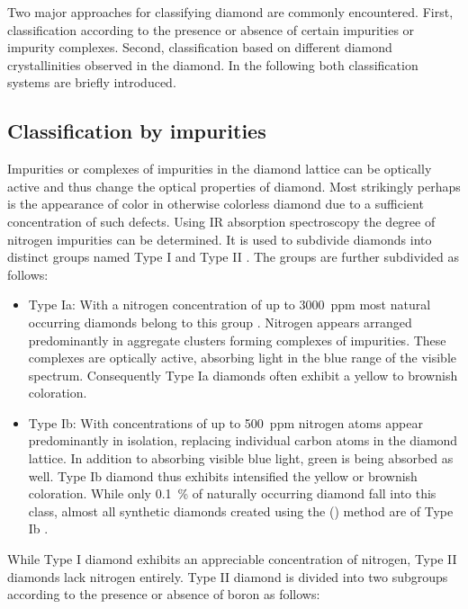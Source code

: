   Two major approaches for classifying diamond are commonly encountered. First, classification according to the presence or absence of certain impurities or impurity complexes. Second, classification based on different diamond crystallinities observed in the diamond. In the following both classification systems are briefly introduced.

  \subsection{Classification by impurities}

    Impurities or complexes of impurities in the diamond lattice can be optically active and thus change the optical properties of diamond. Most strikingly perhaps is the appearance of color in otherwise colorless diamond due to a sufficient concentration of such defects. Using IR absorption spectroscopy the degree of nitrogen impurities can be determined. It is used to subdivide diamonds into distinct groups named Type I and Type II \cite{Kaiser1959, Breeding2009}. The groups are further subdivided as follows:

    \begin{itemize}
          \item Type Ia: With a nitrogen concentration of up to \SI{3000}{ppm} most natural occurring diamonds belong to this group \cite{Zaitsev2001}. Nitrogen appears arranged predominantly in aggregate clusters forming complexes of impurities. These complexes are optically active, absorbing light in the blue range of the visible spectrum. Consequently Type Ia diamonds often exhibit a yellow to brownish coloration.

          \item Type Ib: With concentrations of up to \SI{500}{ppm} nitrogen atoms appear predominantly in isolation, replacing individual carbon atoms in the diamond lattice. In addition to absorbing visible blue light, green is being absorbed as well. Type Ib diamond thus exhibits intensified the yellow or brownish coloration. While only \SI{0.1}{\percent} of naturally occurring diamond fall into this class, almost all synthetic diamonds created using the \hpht (\HPHT) method are of Type Ib \cite{Zaitsev2001}.
    \end{itemize}

    While Type I diamond exhibits an appreciable concentration of nitrogen, Type II diamonds lack nitrogen entirely. Type II diamond is divided into two subgroups according to the presence or absence of boron as follows:

